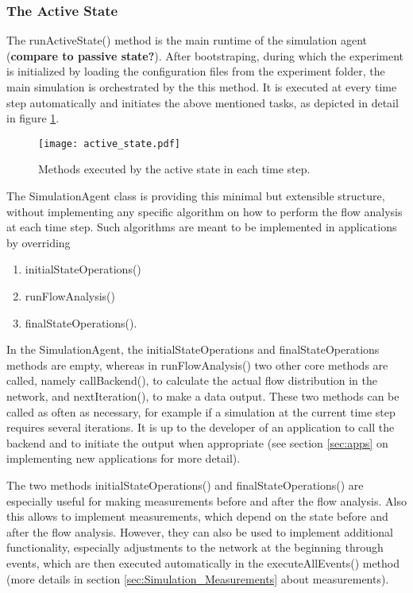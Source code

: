 \documentclass[11pt,fleqn]{book} %
\newcommand{\mainagent}{simulation agent }
\begin{document}
\subsubsection{The Active State}
The runActiveState() method is the main runtime of the \mainagent (\textbf{compare to passive state?}). After bootstraping, during which the experiment is initialized by loading the configuration files from the experiment folder, the main simulation is orchestrated by the this method. It is executed at every time step automatically and initiates the above mentioned tasks, as depicted in detail in figure \ref{fig:active_state}.

\begin{figure}[!h]
\centering\texttt{[image: active\_state.pdf]}
\caption{Methods executed by the active state in each time step.}
\label{fig:active_state}
\end{figure}

The SimulationAgent class is providing this minimal but extensible structure, without implementing any specific algorithm on how to perform the flow analysis at each time step. Such algorithms are meant to be implemented in applications by overriding 
\begin{enumerate}
	\item initialStateOperations()
	\item runFlowAnalysis()
	\item finalStateOperations().
\end{enumerate}

In the SimulationAgent, the initialStateOperations and finalStateOperations methods are empty, whereas in runFlowAnalysis() two other core methods are called, namely callBackend(), to calculate the actual flow distribution in the network, and nextIteration(), to make a data output. These two methods can be called as often as necessary, for example if a simulation at the current time step requires several iterations. It is up to the developer of an application to call the backend and to initiate the output when appropriate (see section \ref{sec:apps} on implementing new applications for more detail).

The two methods initialStateOperations() and finalStateOperations() are especially useful for making measurements before and after the flow analysis. Also this allows to implement measurements, which depend on the state before and after the flow analysis. However, they can also be used to implement additional functionality, especially adjustments to the network at the beginning through events, which are then executed automatically in the executeAllEvents() method (more details in section \ref{sec:Simulation_Measurements} about measurements).
\end{document}
